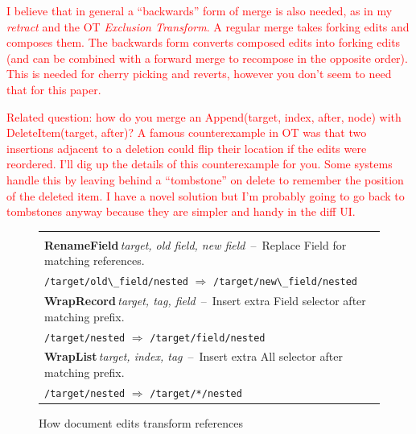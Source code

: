 \documentclass[sigconf,anonymous,screen]{acmart}
\newcommand{\note}[1]{\textcolor{red}{#1}}
\begin{document}
\note{I believe that in general a ``backwards'' form of merge is also needed, as in my \emph{retract} and the OT \emph{Exclusion Transform}. A regular merge takes forking edits and composes them. The backwards form converts composed edits into forking edits (and can be combined with a forward merge to recompose in the opposite order). This is needed for cherry picking and reverts, however you don't seem to need that for this paper.}

\note{Related question: how do you merge an Append(target, index, after, node) with DeleteItem(target, after)? A famous counterexample in OT was that two insertions adjacent to a deletion could flip their location if the edits were reordered. I'll dig up the details of this counterexample for you. Some systems handle this by leaving behind a ``tombstone'' on delete to remember the position of the deleted item. I have a novel solution but I'm probably going to go back to tombstones anyway because they are simpler and handy in the diff UI.}


\begin{figure}
\newcommand{\tttablecol}[5]{
\small{\bfseries #1}\;\,\footnotesize\textit{#2}\,\; --\,\; #5\\[-0.1em]
\quad \footnotesize #3 \;\;$\Rightarrow$\;\; #4 \\[0.3em]
}
\begin{tabular}{|p{27em}|}
\hline
\\[-1em]
\tttablecol{RenameField}{target, old field, new field}{\Verb|/target/old\_field/nested|}{\Verb|/target/new\_field/nested|}
  {Replace Field for matching references.}
\tttablecol{WrapRecord}{target, tag, field}{\Verb|/target/nested|}{\Verb|/target/field/nested|}
  {Insert extra Field selector after matching prefix.}
\tttablecol{WrapList}{target, index, tag}{\Verb|/target/nested|}{\Verb|/target/*/nested|}
  {Insert extra All selector after matching prefix.}
\hline
\end{tabular}
\vspace{-0.5em}
\caption{How document edits transform references}
\label{fig:updates}
\vspace{-1em}
\end{figure}

\end{document}
